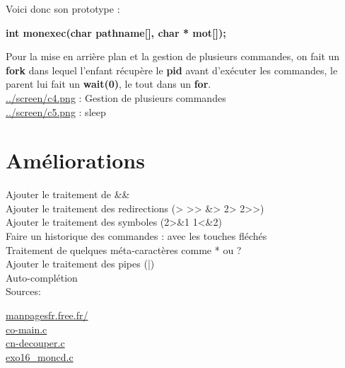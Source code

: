 \documentclass[11pt,a4paper]{report}
\begin{document}
Voici donc son prototype :\newline

\textbf{int monexec(char pathname[], char * mot[]);}\newline

Pour la mise en arrière plan et la gestion de plusieurs commandes, on fait un \textbf{fork} dans lequel l'enfant récupère le \textbf{pid} avant d’exécuter les commandes, le parent lui fait un \textbf{wait(0)}, le tout dans un \textbf{for}.\newline \\
\href{../screen/c4.png}{../screen/c4.png} : Gestion de plusieurs commandes\\
\href{../screen/c5.png}{../screen/c5.png} : sleep


\newpage
\section{Améliorations\\}

Ajouter le traitement de \&\&\\
Ajouter le traitement des redirections (> >> \&> 2> 2>>)\\
Ajouter le traitement des symboles (2>\&1 1<\&2)\\
Faire un historique des commandes : avec les touches fléchés\\
Traitement de quelques méta-caractères comme * ou ?\\
Ajouter le traitement des pipes (|) \\
Auto-complétion\newline \\


Sources:\newline

\href{http://manpagesfr.free.fr/}{manpagesfr.free.fr/}\\
\href{http://www.ai.univ-paris8.fr/~alinehuf/l2/cours4/sources/co-main.c}{co-main.c}\\
\href{http://www.ai.univ-paris8.fr/~alinehuf/l2/cours4/sources/cn-decouper.c}{cn-decouper.c}\\
\href{http://www.ai.univ-paris8.fr/~alinehuf/l2/cours4/sources_exo/exo16_moncd.c}{exo16_moncd.c}
\end{document}
